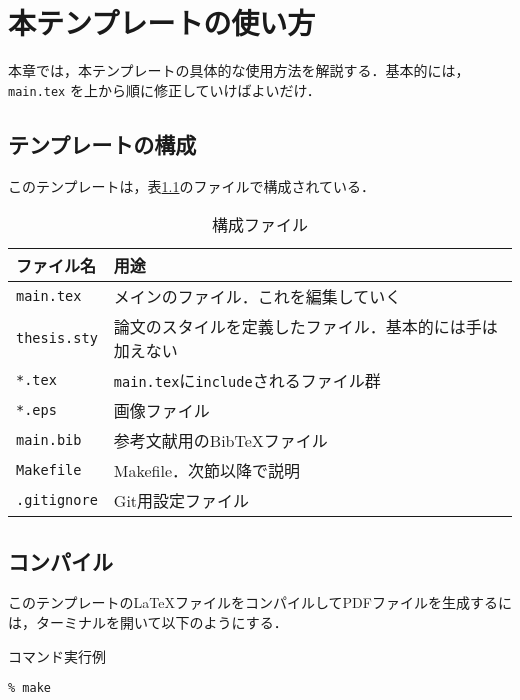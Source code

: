 \chapter{本テンプレートの使い方}
\label{chap:howto}

本章では，本テンプレートの具体的な使用方法を解説する．基本的には，\texttt{main.tex} を上から順に修正していけばよいだけ． 


\section{テンプレートの構成}

このテンプレートは，表\ref{tb:files}のファイルで構成されている．

\begin{table}[htbp]
  \caption{構成ファイル}
  \label{tb:files}
  \begin{center}
    \begin{tabular}{ll}
      \hline
      ファイル名 & 用途 \\ \hline
      \texttt{main.tex} & メインのファイル．これを編集していく \\
      \texttt{thesis.sty} & 論文のスタイルを定義したファイル．基本的には手は加えない \\
      \texttt{*.tex} & \texttt{main.tex}に\texttt{include}されるファイル群 \\
      \texttt{*.eps} & 画像ファイル \\
      \texttt{main.bib} & 参考文献用のBibTeXファイル \\
      \texttt{Makefile} & Makefile．次節以降で説明 \\
      \texttt{.gitignore} & Git用設定ファイル \\ \hline
    \end{tabular}
  \end{center}
\end{table}

\section{コンパイル}
このテンプレートの\LaTeX ファイルをコンパイルしてPDFファイルを生成するには，ターミナルを開いて以下のようにする．

\begin{itembox}[l]{コマンド実行例}
\begin{verbatim}
% make
\end{verbatim}
\end{itembox}

